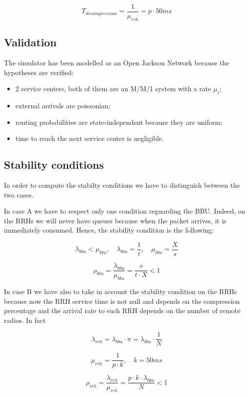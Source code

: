 \documentclass[11pt,a4paper,oneside, openright]{article}
\begin{document}
$$ T_{decompression} = \frac{1}{\mu_{rrh}} = p \cdot 50ms $$

\subsection{Validation}
The simulator has been modelled as an Open Jackson Network because the hypotheses are verified:
\begin{itemize}
    \item 2 service centers, both of them are an M/M/1 system with a rate $ \mu_{i} $;
    \item external arrivals are poissonian;
    \item routing probabilities are state-independent because they are uniform;
    \item time to reach the next service center is negligible.
\end{itemize}


\subsection{Stability conditions}
In order to compute the stabilty conditions we have to distinguish between the two cases.

In case A we have to respect only one condition reguarding the BBU. Indeed, on the RRHs we will never have queues because when the packet arrives, it is immediately consumed.
Hence, the stability condition is the following:

$$ \lambda_{bbu} < \mu_{bbu}, \quad \lambda_{bbu} = \frac{1}{t}, \quad \mu_{bbu} = \frac{X}{s}$$

\begin{equation} \label{eq:rho-bbu}
\rho_{bbu} = \frac{\lambda_{bbu}}{\mu_{bbu}} = \frac{s}{t \cdot X} < 1
\end{equation}

In case B we have also to take in account the stability condition on the RRHs because now the RRH service time is not null and depends on the compression percentage and the arrival rate to each RRH depends on the number of remote radios. In fact

$$ \lambda_{rrh} = \lambda_{bbu} \cdot \pi = \lambda_{bbu} \cdot \frac{1}{N} $$

$$ \mu_{rrh} = \frac{1}{p \cdot k}, \quad k = 50ms $$

\begin{equation}
\rho_{rrh} = \frac{\lambda_{rrh}}{\mu_{rrh}} = \frac{p \cdot k \cdot \lambda_{bbu}}{N} < 1
\end{equation}
\end{document}
